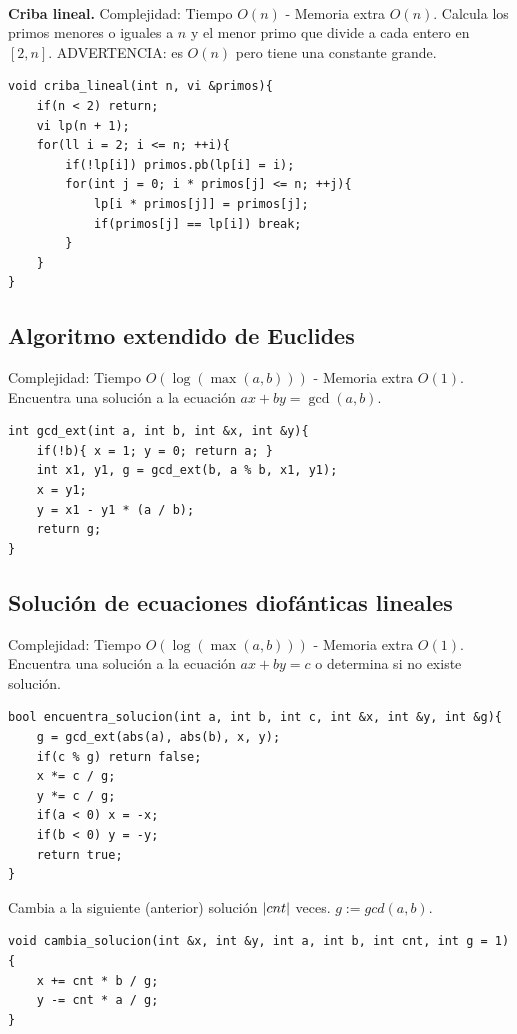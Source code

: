 \documentclass[10pt,spanish,mexico]{article}
\numberwithin{equation}{section}
\begin{document}
\begin{multicols}{2}
\vspace{-1.2\baselineskip}
\hrulefill\\
\textbf{Criba lineal.} Complejidad: Tiempo $O(n)$ - Memoria extra $O(n)$. Calcula los primos menores o iguales a $n$ y el menor primo que divide a cada entero en $[2, n]$. ADVERTENCIA: es $O(n)$ pero tiene una constante grande.
\begin{verbatim}
void criba_lineal(int n, vi &primos){
    if(n < 2) return;
    vi lp(n + 1);
    for(ll i = 2; i <= n; ++i){
        if(!lp[i]) primos.pb(lp[i] = i);
        for(int j = 0; i * primos[j] <= n; ++j){
            lp[i * primos[j]] = primos[j];
            if(primos[j] == lp[i]) break;
        }
    }
}
\end{verbatim}

\vspace{-1.2\baselineskip}
\hrulefill
\subsection{Algoritmo extendido de Euclides}
Complejidad: Tiempo $O(\log (\max(a, b)))$ - Memoria extra $O(1)$. Encuentra una solución a la ecuación $ax + by = \gcd(a, b)$.
\begin{verbatim}
int gcd_ext(int a, int b, int &x, int &y){
    if(!b){ x = 1; y = 0; return a; }
    int x1, y1, g = gcd_ext(b, a % b, x1, y1);
    x = y1;
    y = x1 - y1 * (a / b);
    return g;
}
\end{verbatim}

\vspace{-1.2\baselineskip}
\hrulefill
\subsection{Solución de ecuaciones diofánticas lineales}
Complejidad: Tiempo $O(\log (\max(a, b)))$ - Memoria extra $O(1)$. Encuentra una solución a la ecuación $ax + by = c$ o determina si no existe solución.
\begin{verbatim}
bool encuentra_solucion(int a, int b, int c, int &x, int &y, int &g){
    g = gcd_ext(abs(a), abs(b), x, y);
    if(c % g) return false;
    x *= c / g;
    y *= c / g;
    if(a < 0) x = -x;
    if(b < 0) y = -y;
    return true;
}
\end{verbatim}

Cambia a la siguiente (anterior) solución $\abs{cnt}$ veces. $g := gcd(a ,b)$.
\begin{verbatim}
void cambia_solucion(int &x, int &y, int a, int b, int cnt, int g = 1) {
    x += cnt * b / g;
    y -= cnt * a / g;
}
\end{verbatim}


\end{multicols}
\end{document}
